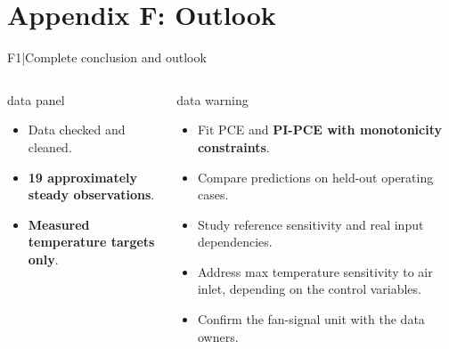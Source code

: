 \section{Appendix F: Outlook}

\renewcommand{\backupcode}{F1}

\begin{frame}[more-space,label=backup-F1]{F1\enspace|\enspace Complete conclusion and outlook}
  \begin{columns}[T,onlytextwidth]
      \begin{beamercolorbox}[sep=2mm,wd=\linewidth]{data panel}
        \small
        \begin{itemize}
          \item Data checked and cleaned.
          \item \textbf{19 approximately steady observations}.
          \item \textbf{Measured temperature targets only}.
        \end{itemize}
      \end{beamercolorbox}
      \begin{beamercolorbox}[sep=2mm,wd=\linewidth]{data warning}
        \small
        \begin{itemize}
          \item Fit PCE and \textbf{PI-PCE with monotonicity constraints}.
          \item Compare predictions on held-out operating cases.
          \item Study reference sensitivity and real input dependencies.
          \item Address max temperature sensitivity to air inlet, depending on the control variables.
          \item Confirm the fan-signal unit with the data owners.
        \end{itemize}
      \end{beamercolorbox}
  \end{columns}
\end{frame}
